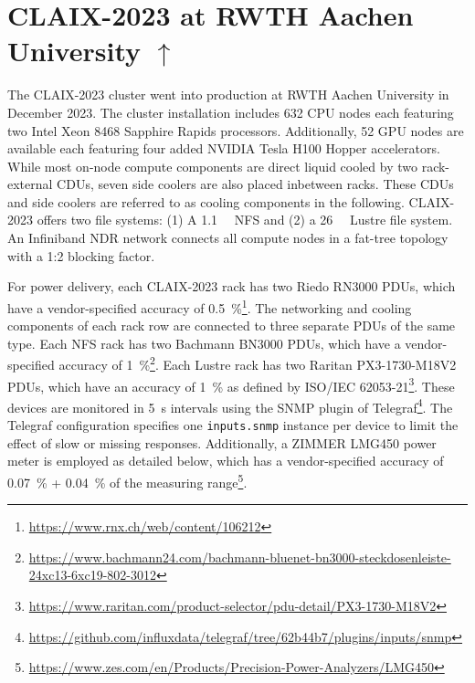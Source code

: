 \section[CLAIX-2023 at RWTH Aachen University]{CLAIX-2023 at RWTH Aachen University \hyperref[tab:examples-overview]{$\uparrow$}}
\label{sec:example-rwth-claix-2023}

The CLAIX-2023 cluster went into production at RWTH Aachen University in December 2023.
The cluster installation includes 632 CPU nodes each featuring two Intel Xeon 8468 Sapphire Rapids processors.
Additionally, 52 GPU nodes are available each featuring four added NVIDIA Tesla H100 Hopper accelerators.
While most on-node compute components are direct liquid cooled by two rack-external \acp{CDU}, seven side coolers are also placed inbetween racks.
These \acp{CDU} and side coolers are referred to as cooling components in the following.
CLAIX-2023 offers two file systems: (1) A \SI{1.1}{\peta\byte} NFS and (2) a \SI{26}{\peta\byte} Lustre file system.
An Infiniband NDR network connects all compute nodes in a fat-tree topology with a 1:2 blocking factor.

For power delivery, each CLAIX-2023 rack has two Riedo RN3000 \acp{PDU}, which have a vendor-specified accuracy of \SI{0.5}{\percent}\footnote{\url{https://www.rnx.ch/web/content/106212}}.
The networking and cooling components of each rack row are connected to three separate \acp{PDU} of the same type.
Each NFS rack has two Bachmann BN3000 \acp{PDU}, which have a vendor-specified accuracy of \SI{1}{\percent}\footnote{\scriptsize\url{https://www.bachmann24.com/bachmann-bluenet-bn3000-steckdosenleiste-24xc13-6xc19-802-3012}}.
Each Lustre rack has two Raritan PX3-1730-M18V2 \acp{PDU}, which have an accuracy of \SI{1}{\percent} as defined by ISO/IEC 62053-21\footnote{\url{https://www.raritan.com/product-selector/pdu-detail/PX3-1730-M18V2}}.
These devices are monitored in \SI{5}{\second} intervals using the \ac{SNMP} plugin of Telegraf\footnote{\url{https://github.com/influxdata/telegraf/tree/62b44b7/plugins/inputs/snmp}}.
The Telegraf configuration specifies one \texttt{inputs.snmp} instance per device to limit the effect of slow or missing responses.
Additionally, a ZIMMER LMG450 power meter is employed as detailed below, which has a vendor-specified accuracy of \SI{0.07}{\percent} + \SI{0.04}{\percent} of the measuring range\footnote{\url{https://www.zes.com/en/Products/Precision-Power-Analyzers/LMG450}}.

